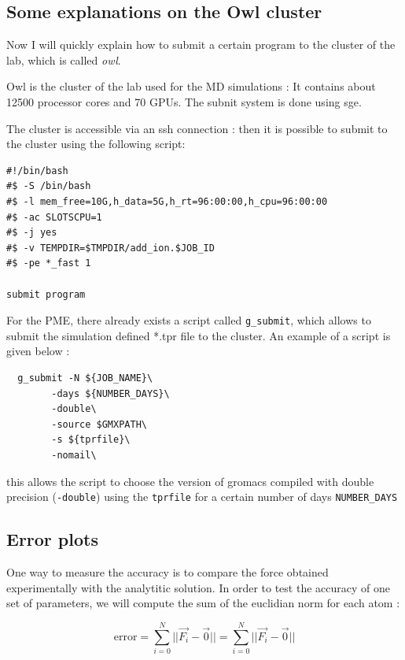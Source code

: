 \documentclass[12pt,twoside,a4paper]{report}
\begin{document}
\subsection{Some explanations on the Owl cluster}

Now I will quickly explain how to submit a certain program to the cluster of the lab, which is called \textit{owl}.

Owl is the cluster of the lab used for the MD simulations : It contains about 12500 processor cores and 70 GPUs. The subnit system is done using sge.  

The cluster is accessible via an ssh connection : then it is possible to submit to the cluster using the following script:


\begin{verbatim}
#!/bin/bash
#$ -S /bin/bash
#$ -l mem_free=10G,h_data=5G,h_rt=96:00:00,h_cpu=96:00:00
#$ -ac SLOTSCPU=1
#$ -j yes
#$ -v TEMPDIR=$TMPDIR/add_ion.$JOB_ID
#$ -pe *_fast 1

submit program 

\end{verbatim}

For the PME, there already exists a script called \texttt{g\_submit}, which allows to submit the simulation defined *.tpr file to the cluster. An example of a script is given below :

\begin{verbatim}
  g_submit -N ${JOB_NAME}\
	    -days ${NUMBER_DAYS}\
	    -double\
	    -source $GMXPATH\
	    -s ${tprfile}\
	    -nomail\
\end{verbatim}

this allows the script to choose the version of gromacs compiled with double precision (\texttt{-double}) using the \texttt{tprfile} for a certain number of days \texttt{NUMBER\_DAYS}



\subsection{Error plots}

One way to measure the accuracy is to compare the force obtained experimentally with the analytitic solution. In order to test the accuracy of one set of parameters, we will compute the sum of the euclidian norm for each atom :

\begin{equation}
	\text{error} = \sum\limits_{i=0}^N ||\vec{F_i} - \vec{0}|| = \sum\limits_{i=0}^N ||\vec{F_i} - \vec{0}||
\end{equation}
\end{document}
